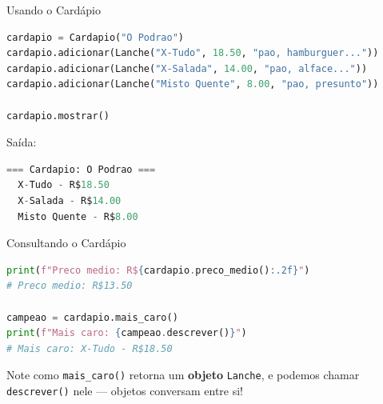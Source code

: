 \documentclass[aspectratio=169]{beamer}
\begin{document}
\begin{frame}{Usando o Cardápio}
  \begin{lstlisting}[language=Python]
cardapio = Cardapio("O Podrao")
cardapio.adicionar(Lanche("X-Tudo", 18.50, "pao, hamburguer..."))
cardapio.adicionar(Lanche("X-Salada", 14.00, "pao, alface..."))
cardapio.adicionar(Lanche("Misto Quente", 8.00, "pao, presunto"))

cardapio.mostrar()
  \end{lstlisting}

  Saída:
  \begin{lstlisting}[language=Python, numbers=none]
=== Cardapio: O Podrao ===
  X-Tudo - R$18.50
  X-Salada - R$14.00
  Misto Quente - R$8.00
  \end{lstlisting}
\end{frame}

\begin{frame}[fragile]{Consultando o Cardápio}
  \begin{lstlisting}[language=Python]
print(f"Preco medio: R${cardapio.preco_medio():.2f}")
# Preco medio: R$13.50

campeao = cardapio.mais_caro()
print(f"Mais caro: {campeao.descrever()}")
# Mais caro: X-Tudo - R$18.50
  \end{lstlisting}

  \vspace{0.5cm}
  Note como \texttt{mais\_caro()} retorna um \textbf{objeto} \texttt{Lanche},
  e podemos chamar \texttt{descrever()} nele --- objetos conversam entre si!
\end{frame}
\end{document}
